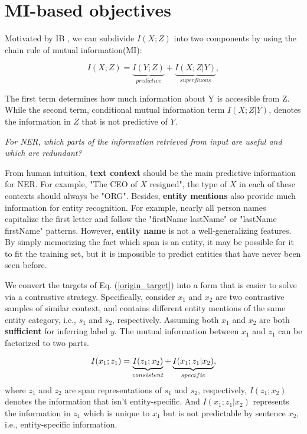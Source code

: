 \documentclass[11pt]{article}
\begin{document}
\section{MI-based objectives}\label{MINER}
Motivated by IB \cite{tishby2000information,federici2020learning}, we can subdivide $I(X;Z)$ into two components by using the chain rule of mutual information(MI):

\begin{equation}
    I(X;Z) = \underbrace{I(Y;Z)}_{predictive} + \underbrace{I(X;Z|Y)}_{superfluous},
    \label{origin_target}
\end{equation}

The first term determines how much information about Y is accessible from Z. While the second term, conditional mutual information term $I(X;Z|Y)$, denotes the information in $Z$ that is not predictive of $Y$. 

\textit{For NER, which parts of the information retrieved from input  are useful and which are redundant?}

From human intuition, \textbf{text context} should be the main predictive information for NER. For example, "The CEO of $X$ resigned", the type of $X$ in each of these contexts should always be "ORG". Besides, \textbf{entity mentions} also provide much information for entity recognition. For example, nearly all person names capitalize the first letter and follow the "firstName lastName" or "lastName firstName" patterns. 
However, \textbf{entity name} is not a well-generalizing features. By simply memorizing the fact which span is an entity, it may be possible for it to fit the training set, but it is impossible to predict entities that have never been seen before.



We convert the targets of Eq. (\ref{origin_target}) into a form that is easier to solve via a contrastive strategy. Specifically, consider $x_1$ and $x_2$ are two contrastive samples of similar context, and contains different entity mentions of the same entity category, i.e., $s_1$ and $s_2$, respectively. Assuming both $x_1$ and $x_2$ are both \textbf{sufficient} for inferring label $y$. The mutual information between $x_1$ and $z_1$ can be factorized to two parts.

\begin{equation}
\setlength{\abovedisplayskip}{1pt}
\setlength{\belowdisplayskip}{10pt}
I(x_1;z_1) = \underbrace{I(z_1;x_2)}_{consistent} + \underbrace{I(x_1;z_1|x_2)}_{specific}, 
\label{approximation}
\end{equation}
where $z_1$ and $z_2$ are span representations of $s_1$ and $s_2$, respectively, $I(z_1; x_2)$ denotes the information that isn't entity-specific. And $I(x_1;z_1|x_2)$ represents the information in $z_1$ which is unique to $x_1$ but is not predictable by sentence $x_2$, i.e., entity-specific information.
\end{document}
